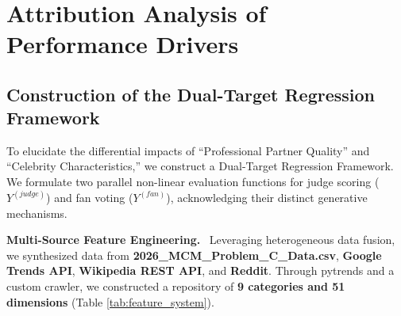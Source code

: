 \documentclass{mcmthesis}
\begin{document}
\linespread{0.95} 

\setlength{\textfloatsep}{5pt plus 1.0pt minus 2.0pt}
\setlength{\floatsep}{5pt plus 1.0pt minus 2.0pt}
\setlength{\intextsep}{5pt plus 1.0pt minus 2.0pt}

\vspace{-0.5em}
\section{Attribution Analysis of Performance Drivers}

\subsection{Construction of the Dual-Target Regression Framework}

To elucidate the differential impacts of ``Professional Partner Quality'' and ``Celebrity Characteristics,'' we construct a Dual-Target Regression Framework. We formulate two parallel non-linear evaluation functions for judge scoring ($Y^{(judge)}$) and fan voting ($Y^{(fan)}$), acknowledging their distinct generative mechanisms.

\noindent \textbf{Multi-Source Feature Engineering.} 
Leveraging heterogeneous data fusion, we synthesized data from \textbf{2026\_MCM\_Problem\_C\_Data.csv}, \textbf{Google Trends API}, \textbf{Wikipedia REST API}, and \textbf{Reddit}. Through pytrends and a custom crawler, we constructed a repository of \textbf{9 categories and 51 dimensions} (Table \ref{tab:feature_system}).
\end{document}
